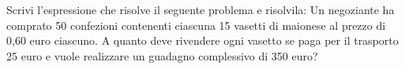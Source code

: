 \item Scrivi l'espressione che risolve il seguente problema e risolvila: Un negoziante ha comprato 50 confezioni contenenti ciascuna 15 vasetti di maionese al prezzo di 0,60 euro ciascuno. A quanto deve rivendere ogni vasetto se paga per il trasporto 25 euro e vuole realizzare un guadagno complessivo di 350 euro?